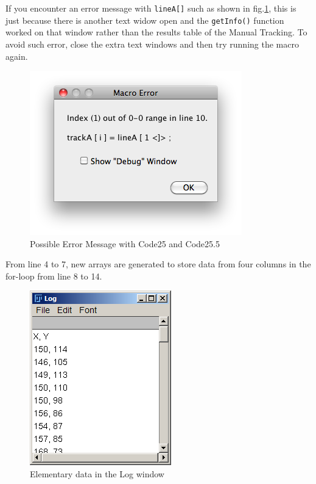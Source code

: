 \documentclass[11pt,a4paper,oneside]{report}
\newcommand{\ilcom}[1]{\texttt{\small#1}}
\begin{document}
If you encounter an error message with \ilcom{lineA[]} such as shown in fig.\ref{fig:fig262_ErrorMessage}, 
this is just because there is another text widow open and the \ilcom{getInfo()} function worked on 
that window rather than the results table of the Manual Tracking. To avoid such error, 
close the extra text windows and then try running the macro again. 
\begin{figure}[htbp]
\begin{center}
\includegraphics[scale=0.6]{fig/fig262_PossibleErrorMessage.png}
\caption{Possible Error Message with Code25 and Code25.5}
\label{fig:fig262_ErrorMessage}
\end{center}
\end{figure}

From line 4 to 7, new arrays are generated to store data from four columns in the for-loop from line 8 to 14. 

\begin{figure}[htbp]
\begin{center}
\includegraphics[scale=0.6]{fig/fig253_CoordinatesPrintedOut.png}
\caption{Elementary data in the Log window}
\label{fig:fig253_CoordinatesPrintedOut}
\end{center}
\end{figure}
\end{document}
